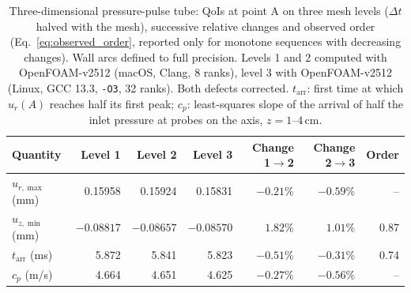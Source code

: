\begin{table}[htbp]
	\centering
	\small
	\setlength{\tabcolsep}{4pt}
	\caption{Three-dimensional pressure-pulse tube: QoIs at point A on three mesh levels ($\Delta t$ halved with the mesh), successive relative changes and observed order (Eq.~\eqref{eq:observed_order}, reported only for monotone sequences with decreasing changes). Wall arcs defined to full precision. Levels 1 and 2 computed with OpenFOAM-v2512 (macOS, Clang, 8 ranks), level 3 with OpenFOAM-v2512 (Linux, GCC 13.3, \texttt{-O3}, 32 ranks). Both defects corrected. $t_\mathrm{arr}$: first time at which $u_r(A)$ reaches half its first peak; $c_p$: least-squares slope of the arrival of half the inlet pressure at probes on the axis, $z = 1$--$4\,\mathrm{cm}$.}
	\label{tab:3dtube}
	\begin{tabular}{lrrrrrr}
		\toprule
		Quantity & Level 1 & Level 2 & Level 3 & Change 1$\to$2 & Change 2$\to$3 & Order \\
		\midrule
		$u_{r,\max}$ (mm) & 0.15958 & 0.15924 & 0.15831 & $-0.21\%$ & $-0.59\%$ & -- \\
		$u_{z,\min}$ (mm) & $-0.08817$ & $-0.08657$ & $-0.08570$ & $1.82\%$ & $1.01\%$ & 0.87 \\
		$t_\mathrm{arr}$ (ms) & 5.872 & 5.841 & 5.823 & $-0.51\%$ & $-0.31\%$ & 0.74 \\
		$c_p$ (m/s) & 4.664 & 4.651 & 4.625 & $-0.27\%$ & $-0.56\%$ & -- \\
		\bottomrule
	\end{tabular}
\end{table}

